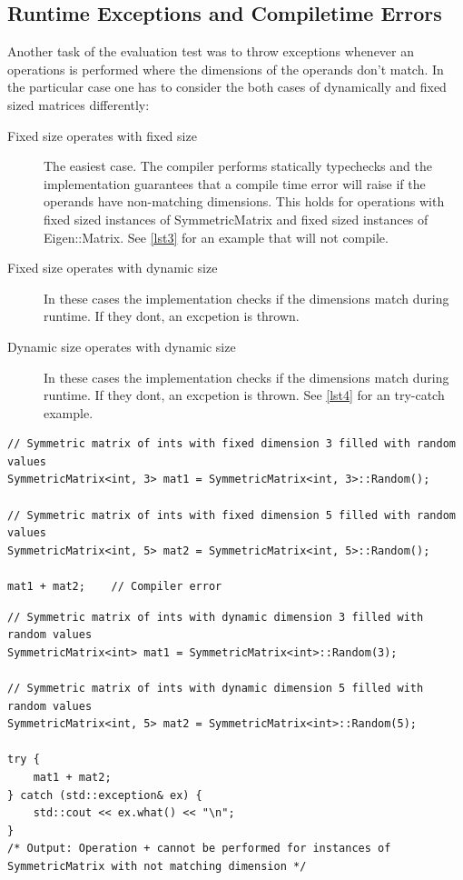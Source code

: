 \documentclass[a4wide]{scrartcl}
\begin{document}
\subsection{Runtime Exceptions and Compiletime Errors}
Another task of the evaluation test was to throw exceptions whenever an operations is performed where the dimensions of the operands don't match. In the particular case one has to consider the both cases of dynamically and fixed sized matrices differently:\newline
\begin{description}
\item[Fixed size operates with fixed size] The easiest case. The compiler performs statically typechecks and the implementation guarantees that a compile time error will raise if the operands have non-matching dimensions. This holds for operations with fixed sized instances of SymmetricMatrix and fixed sized instances of Eigen::Matrix. See \autoref{lst3} for an example that will not compile.
\item[Fixed size operates with dynamic size] In these cases the implementation checks if the dimensions match during runtime. If they dont, an excpetion is thrown.
\item[Dynamic size operates with dynamic size] In these cases the implementation checks if the dimensions match during runtime. If they dont, an excpetion is thrown. See \autoref{lst4} for an try-catch example.
\end{description}
\begin{table}
\begin{lstlisting}[caption={Addition of matrices with different fixed size. This example will not compile.},label=lst3]
// Symmetric matrix of ints with fixed dimension 3 filled with random values
SymmetricMatrix<int, 3> mat1 = SymmetricMatrix<int, 3>::Random();

// Symmetric matrix of ints with fixed dimension 5 filled with random values
SymmetricMatrix<int, 5> mat2 = SymmetricMatrix<int, 5>::Random();

mat1 + mat2;    // Compiler error
\end{lstlisting}
\end{table}
\begin{table}
\begin{lstlisting}[caption={Addition of matrices with different dynamic size.},label=lst4]
// Symmetric matrix of ints with dynamic dimension 3 filled with random values
SymmetricMatrix<int> mat1 = SymmetricMatrix<int>::Random(3);

// Symmetric matrix of ints with dynamic dimension 5 filled with random values
SymmetricMatrix<int, 5> mat2 = SymmetricMatrix<int>::Random(5);

try {
    mat1 + mat2;
} catch (std::exception& ex) {
    std::cout << ex.what() << "\n";     
}
/* Output: Operation + cannot be performed for instances of SymmetricMatrix with not matching dimension */
\end{lstlisting}
\end{table}
\end{document}
